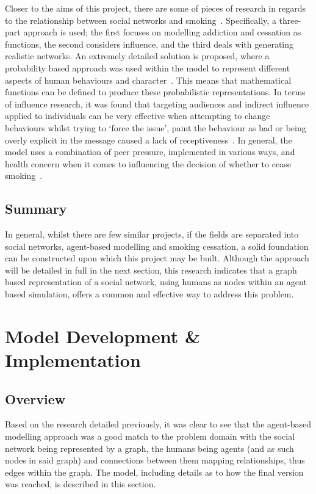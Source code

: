 \documentclass[]{report}
\begin{document}
Closer to the aims of this project, there are some of pieces of research in regards to the relationship between social networks and smoking~\cite{SmokOmni}. Specifically, a three-part approach is used; the first focuses on modelling addiction and cessation as functions, the second considers influence, and the third deals with generating realistic networks. An extremely detailed solution is proposed, where a probability based approach was used within the model to represent different aspects of human behaviours and character~\cite{SmokOmni-pap1}. This means that mathematical functions can be defined to produce these probabilistic representations. In terms of influence research, it was found that targeting audiences and indirect influence applied to individuals can be very effective when attempting to change behaviours whilst trying to `force the issue', paint the behaviour as bad or being overly explicit in the message caused a lack of receptiveness~\cite{SmokOmni-pap2}. In general, the model uses a combination of peer pressure, implemented in various ways, and health concern when it comes to influencing the decision of whether to cease smoking~\cite{SmokOmni-pap3}.

\section{Summary}
In general, whilst there are few similar projects, if the fields are separated into social networks, agent-based modelling and smoking cessation, a solid foundation can be constructed upon which this project may be built. Although the approach will be detailed in full in the next section, this research indicates that a graph based representation of a social network, using humans as nodes within an agent based simulation, offers a common and effective way to address this problem.

%
%

%
%
\chapter{Model Development \& Implementation}
\label{sec:dev}
\section{Overview}
Based on the research detailed previously, it was clear to see that the agent-based modelling approach was a good match to the problem domain with the social network being represented by a graph, the humans being agents (and as such nodes in said graph) and connections between them mapping relationships, thus edges within the graph. The model, including details as to how the final version was reached, is described in this section.
\end{document}
